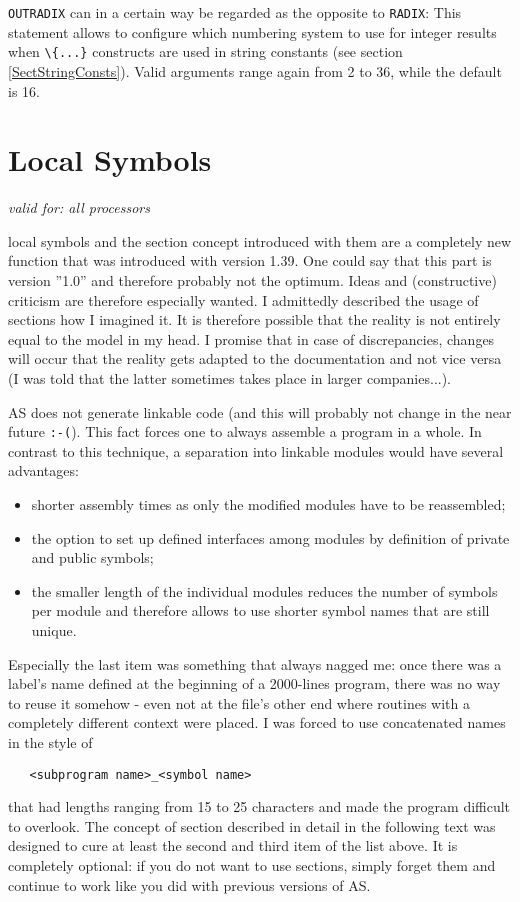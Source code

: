 \documentclass[12pt,twoside]{report}
\newcommand{\tty}[1]{{\tt #1}}
\begin{document}
\tty{OUTRADIX} can in a certain way be regarded as the opposite to
\tty{RADIX}: This statement allows to configure which numbering system to
use for integer results when \verb!\{...}! constructs are used in string
constants (see section \ref{SectStringConsts}).  Valid arguments range
again from 2 to 36, while the default is 16.


\section{Local Symbols}
\label{ChapLocSyms}

{\em valid for: all processors}

local symbols and the section concept introduced with them are a
completely new function that was introduced with version 1.39.  One
could say that this part is version ''1.0'' and therefore probably not
the optimum.  Ideas and (constructive) criticism are therefore
especially wanted.  I admittedly described the usage of sections how
I imagined it.  It is therefore possible that the reality is not
entirely equal to the model in my head.  I promise that in case of
discrepancies, changes will occur that the reality gets adapted to
the documentation and not vice versa (I was told that the latter
sometimes takes place in larger companies...).

AS does not generate linkable code (and this will probably not change
in the near future \tty{:-(}).  This fact forces one to always assemble a
program in a whole.  In contrast to this technique, a separation into
linkable modules would have several advantages:
\begin{itemize}
\item{shorter assembly times as only the modified modules have to be
      reassembled;}
\item{the option to set up defined interfaces among modules by definition
      of private and public symbols;}
\item{the smaller length of the individual modules reduces the number of
      symbols per module and therefore allows to use shorter symbol names
      that are still unique.}
\end{itemize}
Especially the last item was something that always nagged me: once
there was a label's name defined at the beginning of a 2000-lines
program, there was no way to reuse it somehow - even not at the
file's other end where routines with a completely different context
were placed.  I was forced to use concatenated names in the style of
\begin{verbatim}
   <subprogram name>_<symbol name>
\end{verbatim}
that had lengths ranging from 15 to 25 characters and made the
program difficult to overlook.  The concept of section described in
detail in the following text was designed to cure at least the second
and third item of the list above.  It is completely optional: if you
do not want to use sections, simply forget them and continue to work
like you did with previous versions of AS.
\end{document}
